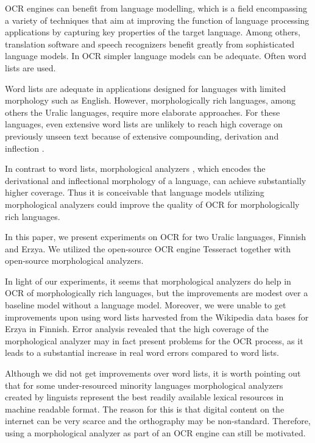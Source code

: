 \documentclass[b5paper]{article}
\begin{document}
OCR engines can benefit from language modelling, which is a field
encompassing a variety of techniques that aim at improving the
function of language processing applications by capturing key
properties of the target language. Among others, translation software
and speech recognizers benefit greatly from sophisticated language
models. In OCR simpler language models can be adequate. Often word
lists are used.

Word lists are adequate in applications designed for languages with
limited morphology such as English. However, morphologically rich
languages, among others the Uralic languages, require more elaborate
approaches. For these languages, even extensive word lists are
unlikely to reach high coverage on previously unseen text because
of extensive compounding, derivation and inflection \cite{creutz07}.

In contrast to word lists, morphological analyzers
\cite{koskenniemi83}, which encodes the derivational and inflectional
morphology of a language, can achieve substantially higher
coverage. Thus it is conceivable that language models utilizing
morphological analyzers could improve the quality of OCR for
morphologically rich languages.

In this paper, we present experiments on OCR for two Uralic languages,
Finnish and Erzya. We utilized the open-source OCR engine Tesseract
\cite{smith07} together with open-source morphological analyzers.

In light of our experiments, it seems that morphological analyzers do
help in OCR of morphologically rich languages, but the improvements
are modest over a baseline model without a language model. Moreover,
we were unable to get improvements upon using word lists harvested
from the Wikipedia data bases for Erzya in Finnish. Error analysis
revealed that the high coverage of the morphological analyzer may in
fact present problems for the OCR process, as it leads to a
substantial increase in real word errors compared to word lists.

Although we did not get improvements over word lists, it is worth
pointing out that for some under-resourced minority languages
morphological analyzers created by linguists represent the best
readily available lexical resources in machine readable format. The
reason for this is that digital content on the internet can be very
scarce and the orthography may be non-standard. Therefore, using a
morphological analyzer as part of an OCR engine can still be
motivated.
\end{document}
